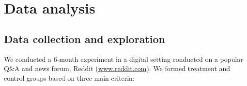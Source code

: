 \documentclass[preprint,12pt]{elsarticle}
\begin{document}














\section{Data analysis}\label{sec{analysis}}

\subsection{Data collection and exploration}\label{subsec:data-and-exploration}









We conducted a 6-month  experiment in a digital setting conducted on a popular Q\&A and news forum, Reddit (\url{www.reddit.com}). We formed treatment and control groups based on three main criteria:
\end{document}
